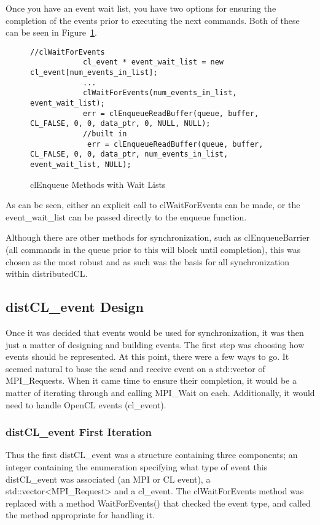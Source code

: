 \documentclass[../thesis.tex]{subfiles}
\begin{document}
        Once you have an event wait list, you have two options for ensuring the completion of the events prior to executing the next commands. Both of these can be seen in Figure~\ref{fig:cl_enqueue_wait_list}.

        \begin{figure}[htbp]
            \centering
            \lstset{language=cpp}  
            \begin{lstlisting}[tabsize=2]
            //clWaitForEvents
            cl_event * event_wait_list = new cl_event[num_events_in_list];
            ...
            clWaitForEvents(num_events_in_list, event_wait_list);
            err = clEnqueueReadBuffer(queue, buffer, CL_FALSE, 0, 0, data_ptr, 0, NULL, NULL);
            //built in
             err = clEnqueueReadBuffer(queue, buffer, CL_FALSE, 0, 0, data_ptr, num_events_in_list, event_wait_list, NULL);
            \end{lstlisting}
            \caption{clEnqueue Methods with Wait Lists}
            \label{fig:cl_enqueue_wait_list}
        \end{figure}

        As can be seen, either an explicit call to clWaitForEvents can be made, or the event\_wait\_list can be passed directly to the enqueue function.

        Although there are other methods for synchronization, such as clEnqueueBarrier (all commands in the queue prior to this will block until completion), this was chosen as the most robust and as such was the basis for all synchronization within distributedCL.

    \subsection{distCL\_event Design} %
    \label{sub:distcl_event_design}
        Once it was decided that events would be used for synchronization, it was then just a matter of designing and building events. The first step was choosing how events should be represented. At this point, there were a few ways to go. It seemed natural to base the send and receive event on a std::vector of MPI\_Requests. When it came time to ensure their completion, it would be a matter of iterating through and calling MPI\_Wait on each. Additionally, it would need to handle OpenCL events (cl\_event). 
        \subsubsection{distCL\_event First Iteration} %
        \label{ssub:distcl_event_first_iteration}
            Thus the first distCL\_event was a structure containing three components; an integer containing the enumeration specifying what type of event this distCL\_event was associated (an MPI or CL event), a std::vector<MPI\_Request> and a cl\_event. The clWaitForEvents method was replaced with a method WaitForEvents() that checked the event type, and called the method appropriate for handling it.
\end{document}
